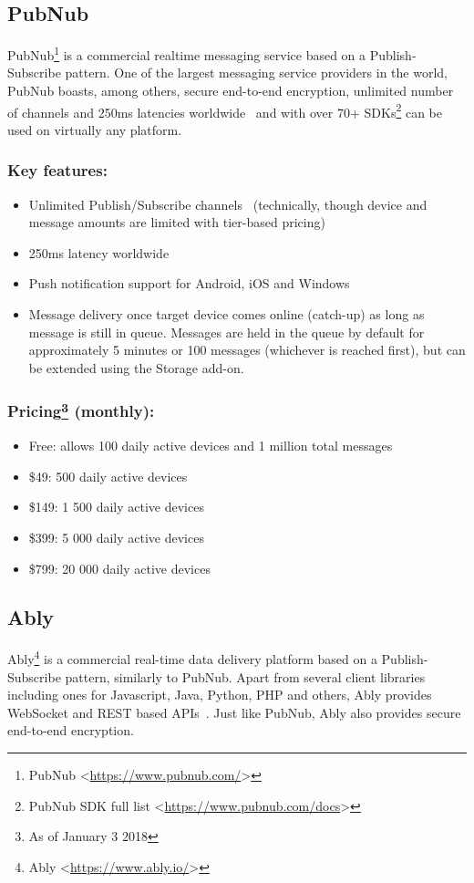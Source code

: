 \subsection{PubNub}
PubNub\footnote{PubNub <\url{https://www.pubnub.com/}>} is a commercial realtime messaging service based on a Publish-Subscribe pattern. One of the largest messaging service providers in the world, PubNub boasts, among others, secure end-to-end encryption, unlimited number of channels and 250ms latencies worldwide~\protect\cite{pubnub-messaging} and with over 70+ SDKs\footnote{PubNub SDK full list <\url{https://www.pubnub.com/docs}>} can be used on virtually any platform.

\subsubsection*{Key features:}
\begin{itemize}
\item Unlimited Publish/Subscribe channels~\protect\cite{pubnub-messaging} (technically, though device and message amounts are limited with tier-based pricing)
\item 250ms latency worldwide~\protect\cite{pubnub-messaging}
\item Push notification support for Android, iOS and Windows
\item Message delivery once target device comes online (catch-up) as long as message is still in queue. Messages are held in the queue by default for approximately 5 minutes or 100 messages (whichever is reached first), but can be extended using the Storage add-on.~\protect\cite{pubnub-catchup}
\end{itemize}

\subsubsection*{Pricing\footnote{As of January 3 2018} (monthly):}
\begin{itemize}
\item Free: allows 100 daily active devices and 1 million total messages
\item \$49: 500 daily active devices
\item \$149: 1 500 daily active devices
\item \$399: 5 000 daily active devices
\item \$799: 20 000 daily active devices
\end{itemize}

\subsection{Ably}
Ably\footnote{Ably <\url{https://www.ably.io/}>} is a commercial real-time data delivery platform based on a Publish-Subscribe pattern, similarly to PubNub. Apart from several client libraries including ones for Javascript, Java, Python, PHP and others\cite{ably-sdk}, Ably provides WebSocket and REST based APIs~\protect\cite{ably-docs}. Just like PubNub, Ably also provides secure end-to-end encryption.

